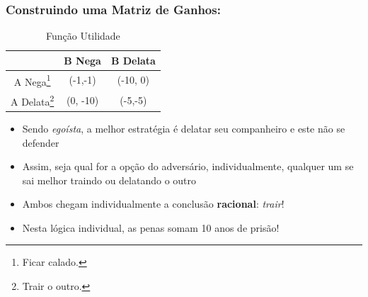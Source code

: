 \begin{frame}
\frametitle{Construindo uma Matriz de Ganhos:}

\begin{table}[!ht]
  \caption{Função Utilidade}
  \begin{center}
  
    \begin{tabular}{c||c|c}
    \hline \hline
               & B Nega & B Delata  \\     \hline \hline
     A Nega\footnote{Ficar calado.}    &   (-1,-1)     &  (-10, 0)  \\     \hline 
     A Delata\footnote{Trair o outro.}  &    (0, -10)   &  (-5,-5)   \\
         \hline \hline
    \end{tabular}
  \end{center}

  \label{tab_01}

\end{table}


\begin{itemize}
  \item Sendo \textit{egoísta}, a melhor estratégia é delatar seu companheiro e este não se defender
  
  \item Assim, seja qual for a opção do adversário, individualmente, qualquer um se sai melhor traindo ou delatando o outro
  
  \item Ambos chegam individualmente a conclusão \textbf{racional}: \textit{trair}!
  
  \item Nesta lógica individual, as penas somam 10 anos de prisão!
    
  \end{itemize}


\end{frame}


